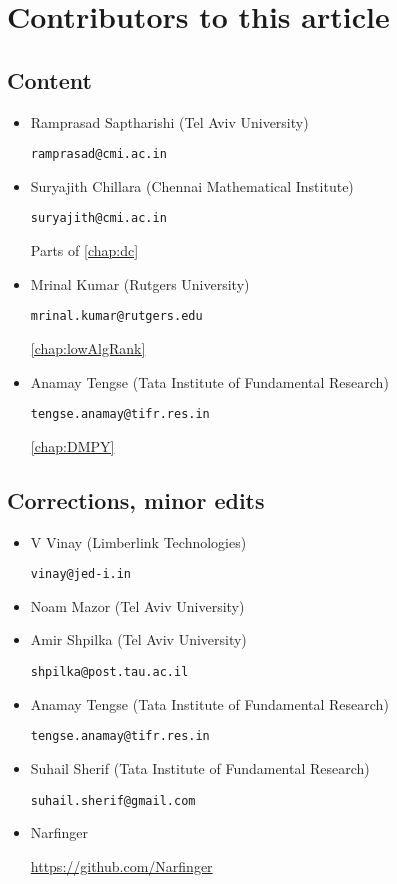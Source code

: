 \chapter*{Contributors to this article}

\section*{Content}

\begin{itemize}
\item Ramprasad Saptharishi (Tel Aviv University)

\texttt{ramprasad@cmi.ac.in}

\item Suryajith Chillara (Chennai Mathematical Institute)

\texttt{suryajith@cmi.ac.in}

Parts of \autoref{chap:dc}

  
\item Mrinal Kumar (Rutgers University)

\texttt{mrinal.kumar@rutgers.edu}

\autoref{chap:lowAlgRank}

\item Anamay Tengse (Tata Institute of Fundamental Research)

\texttt{tengse.anamay@tifr.res.in}

\autoref{chap:DMPY}

\end{itemize}

\section*{Corrections, minor edits}

\begin{itemize}
\item V Vinay (Limberlink Technologies)

\texttt{vinay@jed-i.in}

\item Noam Mazor (Tel Aviv University)

\item Amir Shpilka (Tel Aviv University)

\texttt{shpilka@post.tau.ac.il}

\item Anamay Tengse (Tata Institute of Fundamental Research)

\texttt{tengse.anamay@tifr.res.in}

\item Suhail Sherif (Tata Institute of Fundamental Research)

\texttt{suhail.sherif@gmail.com}

\item Narfinger

  \url{https://github.com/Narfinger}


\end{itemize}


